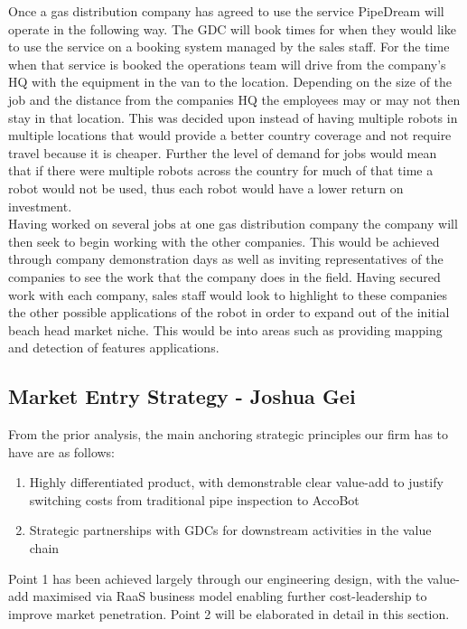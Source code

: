 \documentclass[11pt]{article}		%
\begin{document}
	       Once a gas distribution company has agreed to use the service PipeDream will operate in the following way.
	       The GDC will book times for when they would like to use the service on a booking system  managed by the sales staff. For the time when that service is booked the operations team will drive from the company’s HQ with the equipment in the van to the location. Depending on the size of the job and the distance from the companies HQ the employees may or may not then stay in that location. This was decided upon instead of having multiple robots in multiple locations that would provide a better country coverage and not require travel because it is cheaper. Further the level of demand for jobs would mean that if there were multiple robots across the country for much of that time a robot would not be used, thus each robot would have a lower return on investment.
	       \\
            Having worked on several jobs at one gas distribution company the company will then seek to begin working with the other companies. This would be achieved through company demonstration days as well as inviting representatives of the companies to see the work that the company does in the field. Having secured work with each company, sales staff would look to highlight to these companies the other possible applications of the robot in order to expand out of the initial beach head market niche. This would be into areas such as providing mapping and detection of features applications.
    
    \subsection[Market Entry Strategy]{Market Entry Strategy - Joshua Gei} \label{marketEntry}
    	From the prior analysis, the main anchoring strategic principles our firm has to have are as follows: 
        \begin{enumerate}
        \item Highly differentiated product, with demonstrable clear value-add to justify switching costs from traditional pipe inspection to AccoBot
        \item Strategic partnerships with GDCs for downstream activities in the value chain
        \end{enumerate}
    Point 1 has been achieved largely through our engineering design, with the value-add maximised via RaaS business model enabling further cost-leadership to improve market penetration. Point 2 will be elaborated in detail in this section.  
    
\end{document}
